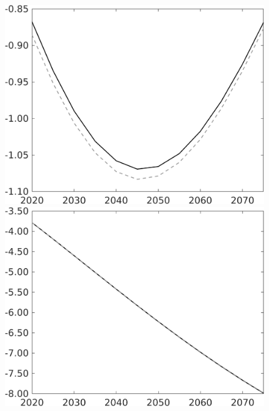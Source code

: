 \documentclass[12pt]{article}
\begin{document}
\begin{figure}[h!!]
\begin{minipage}[]{0.32\textwidth}
\end{minipage}	
\begin{minipage}[]{0.32\textwidth}
\includegraphics[width=1\textwidth]{../../codding_model/own_basedOnFried/optimalPol_010922_revision/figures/all_13Sept22/PerdifNoTauf_Equlab_regime0_CompTaul_Ln_spillover0_nsk0_xgr1_knspil1_sep1_LFlimit0_emsbase0_countec0_GovRev0_etaa0.79_lgd0.png}
\end{minipage}	
\begin{minipage}[]{0.32\textwidth}
\includegraphics[width=1\textwidth]{../../codding_model/own_basedOnFried/optimalPol_010922_revision/figures/all_13Sept22/PerdifNoTauf_Equlab_regime0_CompTaul_EY_spillover0_nsk0_xgr1_knspil1_sep1_LFlimit0_emsbase0_countec0_GovRev0_etaa0.79_lgd0.png}

\end{minipage}
\end{figure}
\end{document}
